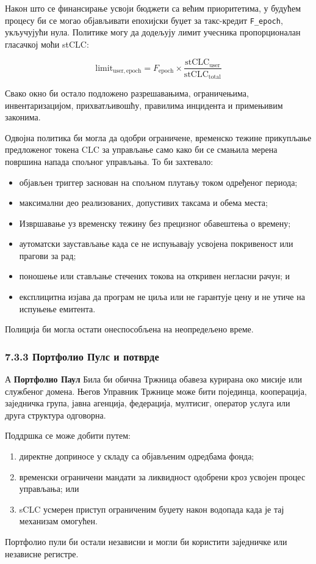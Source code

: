 \documentclass[11pt]{article}
\begin{document}
Након што се финансирање усвоји бюджети са већим приоритетима, у будућем процесу би се могао објављивати епохијски буџет за такс-кредит \texttt{F\_epoch}, укључујући нула. Политике могу да додељују лимит учесника пропорционалан гласачкој моћи stCLC:

\[
\mathrm{limit}_{\mathrm{user,epoch}} = F_{\mathrm{epoch}} \times \frac{\mathrm{stCLC}_{\mathrm{user}}}{\mathrm{stCLC}_{\mathrm{total}}}
\]

Свако окно би остало подложено разрешавањима, ограничењима, инвентаризацијом, прихватљивошћу, правилима инцидента и примењивим законима.

Одвојна политика би могла да одобри ограничене, временско тежине прикупљање предложеног токена CLC за управљање само како би се смањила мерена површина напада спољног управљања. То би захтевало:

\begin{itemize}[leftmargin=*]
\item објављен триггер заснован на спољном плутању током одређеног периода;
\item максимални део реализованих, допустивих таксама и обема места;
\item Извршавање уз временску тежину без прецизног обавештења о времену;
\item аутоматски заустављање када се не испуњавају усвојена покривеност или прагови за рад;
\item поношење или стављање стечених токова на откривен негласни рачун; и
\item експлицитна изјава да програм не циља или не гарантује цену и не утиче на испуњење емитента.
\end{itemize}
Полиција би могла остати онеспособљена на неопредељено време.

\subsubsection*{7.3.3 Портфолио Пулс и потврде}

А \textbf{Портфолио Паул} Била би обична Тржница обавеза курирана око мисије или службеног домена. Његов Управник Тржнице може бити појединца, кооперација, заједничка група, јавна агенција, федерација, мултисиг, оператор услуга или друга структура одговорна.

Поддршка се може добити путем:

\begin{enumerate}[leftmargin=*]
\item директне доприносе у складу са објављеним одредбама фонда;
\item временски ограничени мандати за ликвидност одобрени кроз усвојен процес управљања; или
\item sCLC усмерен приступ ограниченим буџету након водопада када је тај механизам омогућен.
\end{enumerate}
Портфолио пули би остали независни и могли би користити заједничке или независне регистре.
\end{document}
